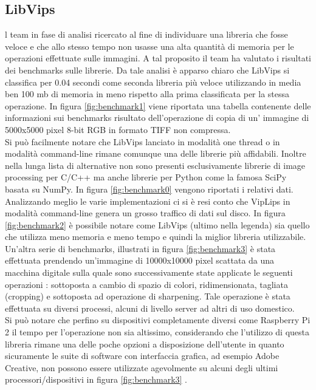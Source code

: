 \documentclass[10pt]{article}
\begin{document}
\subsection{LibVips}
l team in fase di analisi ricercato al fine di individuare una libreria che fosse veloce e che allo stesso tempo non usasse una alta quantità di memoria per le operazioni effettuate sulle immagini. A tal proposito il team ha valutato i risultati dei benchmarks sulle librerie. Da tale analisi è apparso chiaro che LibVips si classifica per 0.04 secondi come seconda libreria più veloce utilizzando in media ben 100 mb di memoria in meno rispetto alla prima classificata per la stessa operazione. In figura \ref{fig:benchmark1} viene riportata una tabella contenente delle informazioni sui benchmarks risultato dell'operazione di copia di un' immagine di 5000x5000 pixel 8-bit RGB in formato TIFF non compressa.\\
Si può facilmente notare che LibVips lanciato in modalità one thread o in modalità command-line rimane comunque una delle librerie più affidabili. Inoltre nella lunga lista di alternative non sono presenti esclusivamente librerie di image processing per C/C++ ma anche librerie per Python come la famosa SciPy basata su NumPy. In figura \ref{fig:benchmark0} vengono riportati i relativi dati.\\
Analizzando meglio le varie implementazioni ci si è resi conto che VipLips in modalità command-line genera un grosso traffico di dati sul disco. In figura \ref{fig:benchmark2} è possibile notare come LibVips (ultimo nella legenda) sia quello che utilizza meno memoria e meno tempo e quindi la miglior libreria utilizzabile.\\
Un’altra serie di benchmarks, illustrati in figura \ref{fig:benchmark3}  è stata effettuata prendendo un’immagine di 10000x10000 pixel scattata da una macchina digitale sulla quale sono successivamente state applicate le seguenti operazioni : sottoposta a cambio di spazio di colori, ridimensionata, tagliata (cropping) e sottoposta ad operazione di sharpening. Tale operazione è stata effettuata su diversi processi, alcuni di livello server ad altri di uso domestico.\\
Si può notare che perfino su dispositivi completamente diversi come Raspberry Pi 2 il tempo per l’operazione non sia altissimo, considerando che  l’utilizzo di questa libreria rimane una delle poche opzioni a disposizione dell’utente in quanto sicuramente le suite di software con interfaccia grafica, ad esempio Adobe Creative, non possono essere utilizzate agevolmente su alcuni degli ultimi processori/dispositivi in figura \ref{fig:benchmark3} .\clearpage
\end{document}
